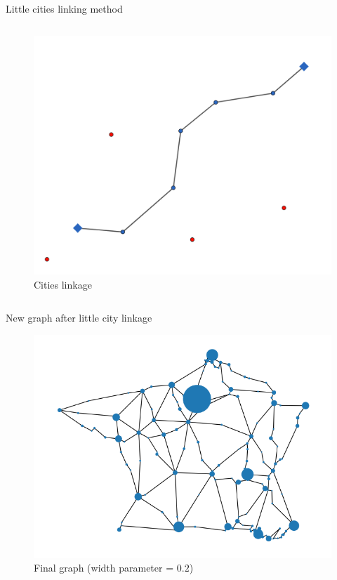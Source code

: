 \begin{frame}{Little cities linking method}
\begin{columns}
        \begin{column}{0.5\paperwidth}
            \begin{figure}
                \includegraphics[height=0.3\paperheight]{images/road_detection/illustration_city_linkage.png}
                \caption{Cities linkage}
            \end{figure}
        \end{column}
    \end{columns}
\end{frame}

\begin{frame}{New graph after little city linkage}
    \begin{figure}
        \includegraphics[height=0.6\paperheight]{images/road_detection/final_graph.png}
        \caption{Final graph (width parameter = $0.2$)}
    \end{figure}
\end{frame}

